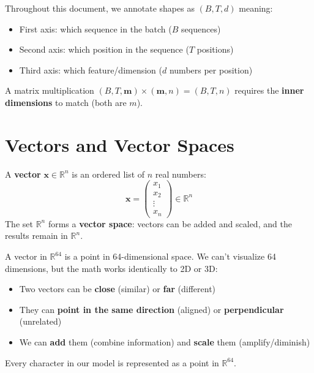\documentclass[11pt, a4paper]{article}
\newcommand{\R}{\mathbb{R}}
\newcommand{\vx}{\bm{x}}
\begin{document}
\begin{intuition}
Throughout this document, we annotate shapes as $(B, T, d)$ meaning:
\begin{itemize}[nosep]
  \item First axis: which sequence in the batch ($B$ sequences)
  \item Second axis: which position in the sequence ($T$ positions)
  \item Third axis: which feature/dimension ($d$ numbers per position)
\end{itemize}
A matrix multiplication $(B, T, \mathbf{m}) \times (\mathbf{m}, n) = (B, T, n)$ requires
the \textbf{inner dimensions} to match (both are $m$).
\end{intuition}

\section{Vectors and Vector Spaces}

\begin{formaldef}[Vector in $\R^n$]
A \textbf{vector} $\vx \in \R^n$ is an ordered list of $n$ real numbers:
\[
\vx = \begin{pmatrix} x_1 \\ x_2 \\ \vdots \\ x_n \end{pmatrix} \in \R^n
\]
The set $\R^n$ forms a \textbf{vector space}: vectors can be added and scaled,
and the results remain in $\R^n$.
\end{formaldef}

\begin{intuition}
A vector in $\R^{64}$ is a point in 64-dimensional space. We can't visualize 64 dimensions,
but the math works identically to 2D or 3D:
\begin{itemize}[nosep]
  \item Two vectors can be \textbf{close} (similar) or \textbf{far} (different)
  \item They can \textbf{point in the same direction} (aligned) or \textbf{perpendicular} (unrelated)
  \item We can \textbf{add} them (combine information) and \textbf{scale} them (amplify/diminish)
\end{itemize}
Every character in our model is represented as a point in $\R^{64}$.
\end{intuition}
\end{document}
